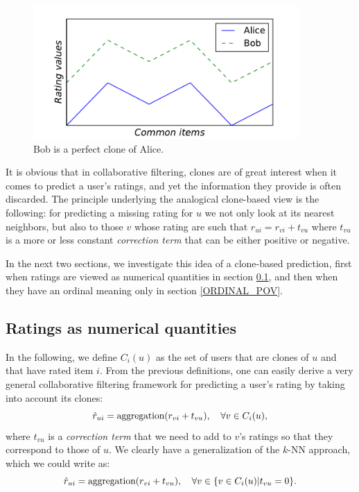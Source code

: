 \begin{figure}[!h]
\centering
\includegraphics[width=4in]{figures/clones.pdf}
\caption{Bob is a perfect clone of Alice.}
\label{FIG_CLONES}
\end{figure}

It is obvious that in collaborative filtering, clones are of great interest when
it comes to predict a user's ratings, and yet the information they provide is
often discarded.  The principle underlying the analogical clone-based view is
the following: for predicting a missing rating for $u$ we not only look at its
nearest neighbors, but also to those $v$ whose rating are such that $r_{ui} =
r_{vi} + t_{vu}$ where $t_{vu}$ is a more or less constant \textit{correction
term} that can be either positive or negative.

In the next two sections, we investigate this idea of a clone-based prediction,
first when ratings are viewed as numerical quantities in section
\ref{NUMERICAL_POV}, and then when they have an ordinal meaning only in
section \ref{ORDINAL_POV}.

\subsection{Ratings as numerical quantities}
\label{NUMERICAL_POV}

In the following, we define $C_i(u)$ as the set of users that are clones of $u$
and that have rated item $i$.  From the previous definitions, one can easily
derive a very general collaborative filtering framework for predicting a user's
rating by taking into account its clones:
$$\hat{r}_{ui} = \text{aggregation}(r_{vi} + t_{vu}), \quad \forall v \in
C_i(u),$$
where $t_{vu}$ is a \textit{correction term} that we need to add to $v$'s
ratings so that they correspond to those of $u$. We clearly have a
generalization of the $k$-NN approach, which we could write as:
$$\hat{r}_{ui} = \text{aggregation}(r_{vi} + t_{vu}), \quad \forall v \in \{v \in C_i(u)
  | t_{vu} = 0\}.$$

